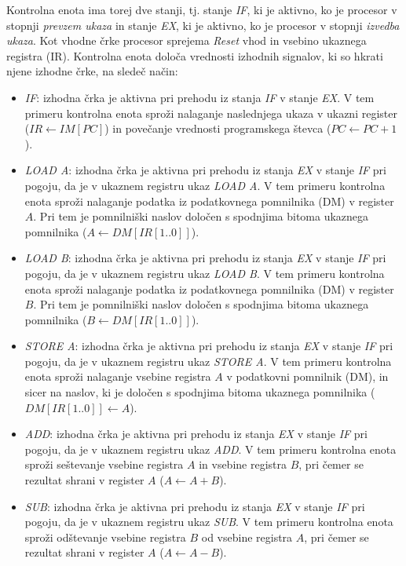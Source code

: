 Kontrolna enota ima torej dve stanji, tj. stanje \emph{IF}, ki je aktivno, ko je procesor v stopnji \emph{prevzem ukaza} in stanje \emph{EX}, ki je aktivno, ko je procesor v stopnji \emph{izvedba ukaza}. Kot vhodne črke procesor sprejema \emph{Reset} vhod in vsebino ukaznega registra (IR). Kontrolna enota določa vrednosti izhodnih signalov, ki so hkrati njene izhodne črke, na sledeč način:
\begin{itemize}
\item \emph{IF}: izhodna črka je aktivna pri prehodu iz stanja \emph{IF} v stanje \emph{EX}. V tem primeru kontrolna enota sproži nalaganje naslednjega ukaza v ukazni register ($IR\leftarrow IM[PC]$) in povečanje vrednosti programskega števca ($PC\leftarrow PC+1$).
\item \emph{LOAD A}: izhodna črka je aktivna pri prehodu iz stanja \emph{EX} v stanje \emph{IF} pri pogoju, da je v ukaznem registru ukaz \emph{LOAD A}. V tem primeru kontrolna enota sproži nalaganje podatka iz podatkovnega pomnilnika (DM) v register $A$. Pri tem je pomnilniški naslov določen s spodnjima bitoma ukaznega pomnilnika ($A\leftarrow DM[IR[1..0]]$).
\item \emph{LOAD B}: izhodna črka je aktivna pri prehodu iz stanja \emph{EX} v stanje \emph{IF} pri pogoju, da je v ukaznem registru ukaz \emph{LOAD B}. V tem primeru kontrolna enota sproži nalaganje podatka iz podatkovnega pomnilnika (DM) v register $B$. Pri tem je pomnilniški naslov določen s spodnjima bitoma ukaznega pomnilnika ($B\leftarrow DM[IR[1..0]]$).
\item \emph{STORE A}: izhodna črka je aktivna pri prehodu iz stanja \emph{EX} v stanje \emph{IF} pri pogoju, da je v ukaznem registru ukaz \emph{STORE A}. V tem primeru kontrolna enota sproži nalaganje vsebine registra $A$ v podatkovni pomnilnik (DM), in sicer na naslov, ki je določen s spodnjima bitoma ukaznega pomnilnika ($DM[IR[1..0]]\leftarrow A$).
\item \emph{ADD}: izhodna črka je aktivna pri prehodu iz stanja \emph{EX} v stanje \emph{IF} pri pogoju, da je v ukaznem registru ukaz \emph{ADD}. V tem primeru kontrolna enota sproži seštevanje vsebine registra $A$ in vsebine registra $B$, pri čemer se rezultat shrani v register $A$ ($A\leftarrow A+B$).
\item \emph{SUB}: izhodna črka je aktivna pri prehodu iz stanja \emph{EX} v stanje \emph{IF} pri pogoju, da je v ukaznem registru ukaz \emph{SUB}. V tem primeru kontrolna enota sproži odštevanje vsebine registra $B$ od vsebine registra $A$, pri čemer se rezultat shrani v register $A$ ($A\leftarrow A-B$).
\end{itemize}


